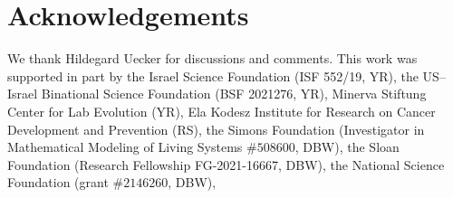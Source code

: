 \documentclass[12pt]{extarticle}
\begin{document}
{\small
\section*{Acknowledgements}
We thank Hildegard Uecker for discussions and comments. 
This work was supported in part by
the Israel Science Foundation (ISF 552/19, YR),
the US–Israel Binational Science Foundation (BSF 2021276, YR), 
Minerva Stiftung Center for Lab Evolution (YR), 
Ela Kodesz Institute for Research on Cancer Development and Prevention (RS),
the Simons Foundation (Investigator in Mathematical Modeling of Living Systems $\#508600$, DBW),
the Sloan Foundation (Research Fellowship FG-2021-16667, DBW),
the National Science Foundation (grant $\#2146260$, DBW),
}


\nolinenumbers
%



\clearpage
\end{document}
